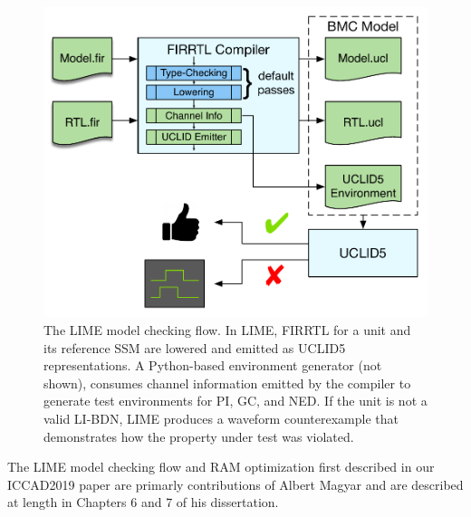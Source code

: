 \begin{figure}
  \centering
    \includegraphics[width=\columnwidth]{figures/lime_flow_small.pdf}
    \caption{The LIME model checking flow. In LIME, FIRRTL for a unit and its
    reference SSM are lowered and emitted as UCLID5 representations. A
    Python-based environment generator (not shown), consumes channel information
    emitted by the compiler to generate test environments for PI, GC, and NED.
    If the unit is not a valid LI-BDN, LIME produces a waveform counterexample
    that demonstrates how the property under test was violated.
    }
  \label{fig:lime-flow}
\end{figure}


The LIME model checking flow and RAM optimization first described in our
ICCAD2019 paper are primarly contributions of Albert Magyar and are described
at length in Chapters 6 and 7 of his dissertation.

